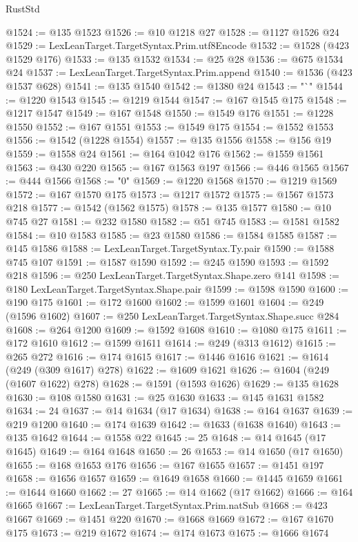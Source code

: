 \begin{lexlean}{RustStd}
\begin{coremodule}
@1524 := @135 @1523
@1526 := @10 @1218 @27
@1528 := @1127 @1526 @24
@1529 := LexLeanTarget.TargetSyntax.Prim.utf8Encode
@1532 := @1528 (@423 @1529 @176)
@1533 := @135 @1532
@1534 := @25 @28
@1536 := @675 @1534 @24
@1537 := LexLeanTarget.TargetSyntax.Prim.append
@1540 := @1536 (@423 @1537 @628)
@1541 := @135 @1540
@1542 := @1380 @24
@1543 := "`"
@1544 := @1220 @1543
@1545 := @1219 @1544
@1547 := @167 @1545 @175
@1548 := @1217 @1547
@1549 := @167 @1548
@1550 := @1549 @176
@1551 := @1228 @1550
@1552 := @167 @1551
@1553 := @1549 @175
@1554 := @1552 @1553
@1556 := @1542 (@1228 @1554)
@1557 := @135 @1556
@1558 := @156 @19
@1559 := @1558 @24
@1561 := @164 @1042 @176
@1562 := @1559 @1561
@1563 := @430 @220
@1565 := @167 @1563 @197
@1566 := @446 @1565
@1567 := @444 @1566
@1568 := "0"
@1569 := @1220 @1568
@1570 := @1219 @1569
@1572 := @167 @1570 @175
@1573 := @1217 @1572
@1575 := @1567 @1573 @218
@1577 := @1542 (@1562 @1575)
@1578 := @135 @1577
@1580 := @10 @745 @27
@1581 := @232 @1580
@1582 := @51 @745
@1583 := @1581 @1582
@1584 := @10 @1583
@1585 := @23 @1580
@1586 := @1584 @1585
@1587 := @145 @1586
@1588 := LexLeanTarget.TargetSyntax.Ty.pair
@1590 := @1588 @745 @107
@1591 := @1587 @1590
@1592 := @245 @1590
@1593 := @1592 @218
@1596 := @250 LexLeanTarget.TargetSyntax.Shape.zero @141
@1598 := @180 LexLeanTarget.TargetSyntax.Shape.pair
@1599 := @1598 @1590
@1600 := @190 @175
@1601 := @172 @1600
@1602 := @1599 @1601
@1604 := @249 (@1596 @1602)
@1607 := @250 LexLeanTarget.TargetSyntax.Shape.succ @284
@1608 := @264 @1200
@1609 := @1592 @1608
@1610 := @1080 @175
@1611 := @172 @1610
@1612 := @1599 @1611
@1614 := @249 (@313 @1612)
@1615 := @265 @272
@1616 := @174 @1615
@1617 := @1446 @1616
@1621 := @1614 (@249 (@309 @1617) @278)
@1622 := @1609 @1621
@1626 := @1604 (@249 (@1607 @1622) @278)
@1628 := @1591 (@1593 @1626)
@1629 := @135 @1628
@1630 := @108 @1580
@1631 := @25 @1630
@1633 := @145 @1631 @1582
@1634 := 24
@1637 := @14 @1634 (@17 @1634)
@1638 := @164 @1637
@1639 := @219 @1200
@1640 := @174 @1639
@1642 := @1633 (@1638 @1640)
@1643 := @135 @1642
@1644 := @1558 @22
@1645 := 25
@1648 := @14 @1645 (@17 @1645)
@1649 := @164 @1648
@1650 := 26
@1653 := @14 @1650 (@17 @1650)
@1655 := @168 @1653 @176
@1656 := @167 @1655
@1657 := @1451 @197
@1658 := @1656 @1657
@1659 := @1649 @1658
@1660 := @1445 @1659
@1661 := @1644 @1660
@1662 := 27
@1665 := @14 @1662 (@17 @1662)
@1666 := @164 @1665
@1667 := LexLeanTarget.TargetSyntax.Prim.natSub
@1668 := @423 @1667
@1669 := @1451 @220
@1670 := @1668 @1669
@1672 := @167 @1670 @175
@1673 := @219 @1672
@1674 := @174 @1673
@1675 := @1666 @1674

\end{coremodule}
\end{lexlean}
